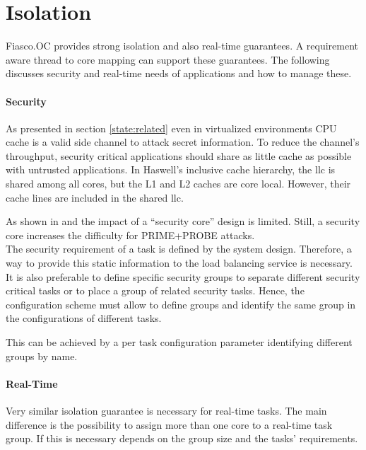 \section{Isolation}
\label{design:isolation}

Fiasco.OC provides strong isolation and also real-time guarantees.
A requirement aware thread to core mapping can support these guarantees.
The following discusses security and real-time needs of applications and how to
manage these.

\paragraph{Security}
As presented in section \ref{state:related} even in virtualized environments
CPU cache is a valid side channel to attack secret information.
To reduce the channel's throughput, security critical applications should share
as little cache as possible with untrusted applications.
In Haswell's inclusive cache hierarchy, the \gls{llc} is shared among all
cores, but the L1 and L2 caches are core local.
However, their cache lines are included in the shared \gls{llc}.

As shown in \cite{inci_seriously_2015} and \cite{liu_last-level_2015}
the impact of a ``security core'' design is limited.
Still, a security core increases the difficulty for PRIME+PROBE attacks.
\\

The security requirement of a task is defined by the system design.
Therefore, a way to provide this static information to the load balancing
service is necessary.
It is also preferable to define specific security groups to separate different
security critical tasks or to place a group of related security tasks.
Hence, the configuration scheme must allow to define groups and identify the
same group in the configurations of different tasks.

This can be achieved by a per task configuration parameter identifying
different groups by name.


\paragraph{Real-Time}
Very similar isolation guarantee is necessary for real-time tasks.
The main difference is the possibility to assign more than one core to a
real-time task group.
If this is necessary depends on the group size and the tasks' requirements.

